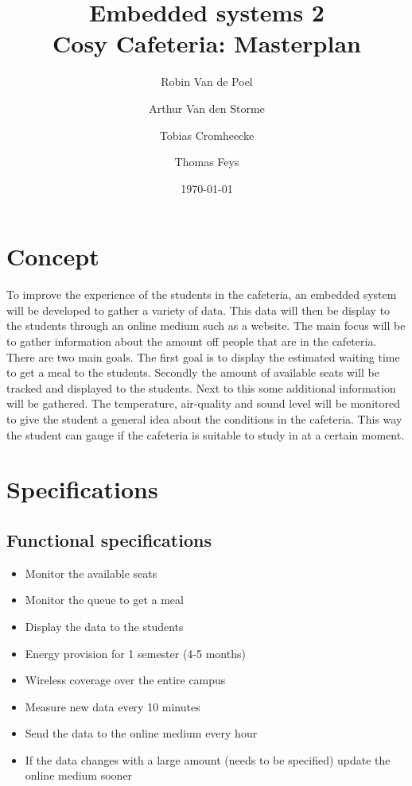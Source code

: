 \documentclass[11pt,a4paper]{article}
\begin{document}
	\title{Embedded systems 2\\
		\Huge Cosy Cafeteria: Masterplan
	}
	\author{Robin Van de Poel\and Arthur Van den Storme\and Tobias Cromheecke\and Thomas Feys}
	\date{\today}
	\maketitle
	\newpage
	
	\tableofcontents
	\newpage

	
	\section{Concept}
	To improve the experience of the students in the cafeteria, an embedded system will be developed to gather a variety of data. This data will then be display to the students through an online medium such as a website. The main focus will be to gather information about the amount off people that are in the cafeteria. There are two main goals. The first goal is to display the estimated waiting time to get a meal to the students. Secondly the amount of available seats will be tracked and displayed to the students. Next to this some additional information will be gathered. The temperature, air-quality and sound level will be monitored to give the student a general idea about the conditions in the cafeteria. This way the student can gauge if the cafeteria is suitable to study in at a certain moment. 

	\section{Specifications}
	\subsection{Functional specifications}
	\begin{itemize}
		\item Monitor the available seats
		\item Monitor the queue to get a meal
		\item Display the data to the students
		\item Energy provision for 1 semester (4-5 months)
		\item Wireless coverage over the entire campus
		\item Measure new data every 10 minutes
		\item Send the data to the online medium every hour 
		\item If the data changes with a large amount (needs to be specified) update the online medium sooner
	\end{itemize}
\end{document}
